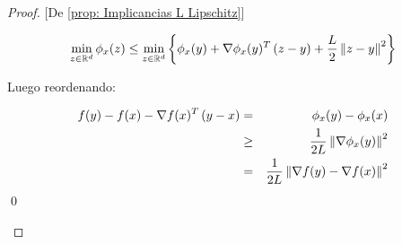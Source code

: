 \begin{proof}{[De \ref{prop: Implicancias L Lipschitz}]}
\begin{enumerate}
		\begin{equation*}
			\min\limits_{z \in {\mathbb{R}}^d} {\phi_x(z)} \leq \min\limits_{z \in {\mathbb{R}}^d} \left\lbrace\phi_x(y) + \nabla \phi_x(y)^T \left(z-y\right) + \dfrac{L}{2}\left\lVert z-y\right\rVert^2\right\rbrace
		\end{equation*}
		
		Luego reordenando:
		
		\begin{equation*}
		\begin{aligned}
			f(y) - f(x) - \nabla f(x)^T \left(y-x\right) & = & \phi_x(y) - \phi_x(x) \\
			& \geq & \frac{1}{2L} \left\lVert\nabla \phi_x(y)\right\rVert^2 \\
			& = & \frac{1}{2L} \left\lVert\nabla f(y) - \nabla f(x)\right\rVert^2
		\end{aligned}
		\end{equation*}
		\qed
	\end{enumerate}
\end{proof}

